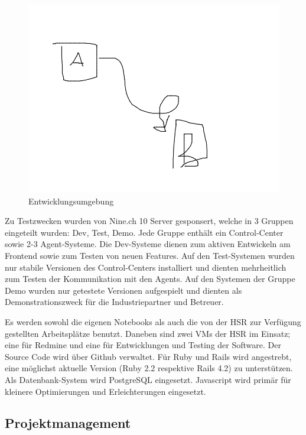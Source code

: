 \begin{figure}[H]
	\centering
	\includegraphics[width=\linewidth]{fig/entwicklungsumgebung}
	\caption{Entwicklungsumgebung}
	\label{fig:pm:entwicklungsumgebung}
\end{figure}

Zu Testzwecken wurden von Nine.ch 10 Server gesponsert, welche  in 3 Gruppen eingeteilt wurden: Dev, Test, Demo. Jede Gruppe enthält ein Control-Center sowie 2-3 Agent-Systeme. Die Dev-Systeme dienen zum aktiven Entwickeln am Frontend sowie zum Testen von neuen Features. Auf den Test-Systemen wurden nur stabile Versionen des Control-Centers installiert und dienten mehrheitlich zum Testen der Kommunikation mit den Agents. Auf den Systemen der Gruppe Demo wurden nur getestete Versionen aufgespielt und dienten als Demonstrationszweck für die Industriepartner und Betreuer.

Es werden sowohl die eigenen Notebooks als auch die von der HSR zur Verfügung gestellten Arbeitsplätze benutzt. Daneben sind zwei VMs der HSR im Einsatz; eine für Redmine und eine für Entwicklungen und Testing der Software. Der Source Code wird über Github verwaltet.
Für Ruby und Rails wird angestrebt, eine möglichst aktuelle Version (Ruby 2.2 respektive Rails 4.2) zu unterstützen. Als Datenbank-System wird PostgreSQL eingesetzt. Javascript wird primär für kleinere Optimierungen und Erleichterungen eingesetzt. 

\subsection*{Projektmanagement}

